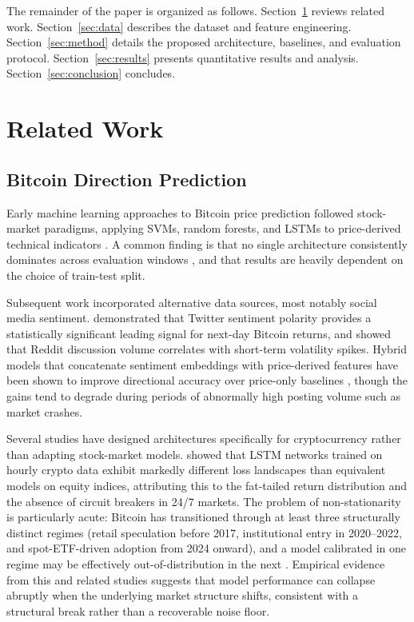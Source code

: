 \documentclass[final,3p,times,authoryear]{elsarticle}
\begin{document}
The remainder of the paper is organized as follows.
Section~\ref{sec:related} reviews related work.
Section~\ref{sec:data} describes the dataset and feature engineering.
Section~\ref{sec:method} details the proposed architecture, baselines,
and evaluation protocol.
Section~\ref{sec:results} presents quantitative results and analysis.
Section~\ref{sec:conclusion} concludes.

\section{Related Work}
\label{sec:related}

\subsection{Bitcoin Direction Prediction}

Early machine learning approaches to Bitcoin price prediction followed
stock-market paradigms, applying SVMs, random forests, and LSTMs to
price-derived technical indicators \citep{mcnally2018predicting,
patel2015predicting}.
A common finding is that no single architecture consistently dominates
across evaluation windows \citep{ji2019bitcoin}, and that results are
heavily dependent on the choice of train-test split.

Subsequent work incorporated alternative data sources, most notably
social media sentiment.
\citet{zhang2021sentiment} demonstrated that Twitter sentiment polarity
provides a statistically significant leading signal for next-day Bitcoin
returns, and \citet{abraham2018crypto} showed that Reddit discussion
volume correlates with short-term volatility spikes.
Hybrid models that concatenate sentiment embeddings with price-derived
features have been shown to improve directional accuracy over price-only
baselines \citep{valencia2019sentiment}, though the gains tend to degrade
during periods of abnormally high posting volume such as market crashes.

Several studies have designed architectures specifically for
cryptocurrency rather than adapting stock-market models.
\citet{lahmiri2019cryptocurrency} showed that LSTM networks trained on
hourly crypto data exhibit markedly different loss landscapes than
equivalent models on equity indices, attributing this to the fat-tailed
return distribution and the absence of circuit breakers in 24/7 markets.
The problem of non-stationarity is particularly acute: Bitcoin has
transitioned through at least three structurally distinct regimes
(retail speculation before 2017, institutional entry in 2020--2022, and
spot-ETF-driven adoption from 2024 onward), and a model calibrated in
one regime may be effectively out-of-distribution in the next
\citep{bouri2019regime}.
Empirical evidence from this and related studies suggests that model
performance can collapse abruptly when the underlying market structure
shifts, consistent with a structural break rather than a recoverable
noise floor.
\end{document}
